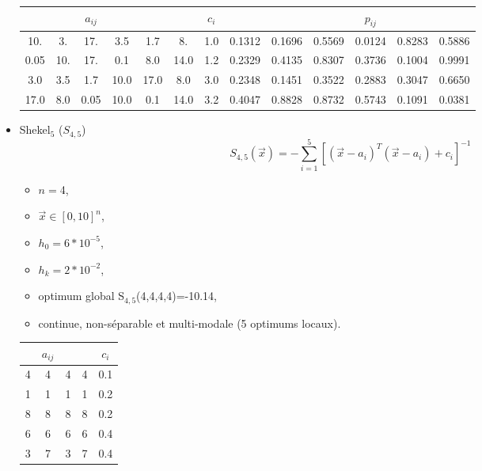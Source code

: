 \begin{itemize}
	\begin{table}[H]\centering
		\begin{tabular}{cccccc|c|cccccc}
			\toprule \textbf{} & \textbf{} & \textbf{$a_{ij}$} & \textbf{} & \textbf{} & \textbf{} & \textbf{$c_i$} & \textbf{} & \textbf{} & \textbf{} & \textbf{$p_{ij}$} & \textbf{} & \textbf{}  \\    \midrule
			10. & 3. & 17. & 3.5 & 1.7 & 8. & 1.0 & 0.1312 & 0.1696 & 0.5569 & 0.0124 & 0.8283 & 0.5886 \\  
			0.05 & 10. & 17. & 0.1 & 8.0 & 14.0 & 1.2 & 0.2329 & 0.4135 & 0.8307 &0.3736 & 0.1004 & 0.9991  \\ 
			3.0 & 3.5 & 1.7 & 10.0 & 17.0 & 8.0 & 3.0 & 0.2348 & 0.1451 & 0.3522 & 0.2883 & 0.3047 & 0.6650  \\
			17.0 & 8.0 & 0.05 & 10.0 & 0.1 & 14.0 & 3.2 & 0.4047 & 0.8828 & 0.8732 & 0.5743 &0.1091 &0.0381  \\ 
			\bottomrule	
		\end{tabular}
	\end{table}
	\vspace{5em}
	\item Shekel$_5$ ($S_{4,5}$)\\$$S_{4,5}(\overrightarrow{x})= -\sum_{i=1}^{5} [(\overrightarrow{x}-a_i)^T(\overrightarrow{x}-a_i)+c_i]^{-1}$$

	\begin{itemize}[label={$\circ$}]
		\item $n=$4, 
		\item $\overrightarrow{x} \in [0,10]^n$,
		\item $h_0=6*10^{-5}$,
		\item $h_k=2*10^{-2}$,
		\item optimum global S$_{4,5}$(4,4,4,4)=-10.14,
		\item continue, non-séparable et multi-modale (5 optimums locaux).
	\end{itemize}

	\bigskip

	\begin{table}[H]\centering
		\begin{tabular}{cccc|c}
			\toprule \textbf{} & \textbf{$a_{ij}$} & \textbf{} & \textbf{} & \textbf{$c_i$}\\    \midrule
			4 & 4 & 4 & 4 & 0.1    \\  
			1 & 1 & 1 & 1 & 0.2   \\ 
			8 & 8 & 8 & 8 & 0.2  \\
			6 & 6 & 6 & 6 & 0.4   \\ 
			3 & 7 & 3 & 7 & 0.4 \\ 
			\bottomrule	
		\end{tabular}
	\end{table}


\end{itemize}
